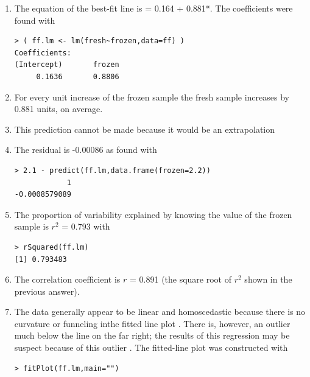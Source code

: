 \documentclass[10pt,openany]{book}\usepackage[]{graphicx}\usepackage[]{color}
\makeatletter
\newenvironment{kframe}{%
 \def\at@end@of@kframe{}%
 \ifinner\ifhmode%
  \def\at@end@of@kframe{\end{minipage}}%
  \begin{minipage}{\columnwidth}%
 \fi\fi%
 \def\FrameCommand##1{\hskip\@totalleftmargin \hskip-\fboxsep
 \colorbox{shadecolor}{##1}\hskip-\fboxsep
     \hskip-\linewidth \hskip-\@totalleftmargin \hskip\columnwidth}%
 \MakeFramed {\advance\hsize-\width
   \@totalleftmargin\z@ \linewidth\hsize
   \@setminipage}}%
 {\par\unskip\endMakeFramed%
 \at@end@of@kframe}
\newenvironment{knitrout}{}{} %
\makeatother
\begin{document}
\begin{itemize}
\begin{enumerate}
      \item The equation of the best-fit line is  = 0.164 + 0.881*.  The coefficients were found with
\begin{knitrout}
\color{fgcolor}\begin{kframe}
\begin{verbatim}
> ( ff.lm <- lm(fresh~frozen,data=ff) )
Coefficients:
(Intercept)       frozen  
     0.1636       0.8806  
\end{verbatim}
\end{kframe}
\end{knitrout}
      \item For every unit increase of the frozen sample the fresh sample increases by 0.881 units, on average.
      \item This prediction cannot be made because it would be an extrapolation
      \item The residual is -0.00086 as found with
\begin{knitrout}
\color{fgcolor}\begin{kframe}
\begin{verbatim}
> 2.1 - predict(ff.lm,data.frame(frozen=2.2))
            1 
-0.0008579089 
\end{verbatim}
\end{kframe}
\end{knitrout}
      \item The proportion of variability explained by knowing the value of the frozen sample is $r^{2}$ = 0.793 with
\begin{knitrout}
\color{fgcolor}\begin{kframe}
\begin{verbatim}
> rSquared(ff.lm)
[1] 0.793483
\end{verbatim}
\end{kframe}
\end{knitrout}
      \item The correlation coefficient is $r$ = 0.891 (the square root of $r^{2}$ shown in the previous answer).
      \item The data generally appear to be linear and homoscedastic because there is no curvature or funneling inthe fitted line plot .  There is, however, an outlier much below the line on the far right; the results of this regression may be suspect because of this outlier .  The fitted-line plot was constructed with
\begin{knitrout}
\color{fgcolor}\begin{kframe}
\begin{verbatim}
> fitPlot(ff.lm,main="")
\end{verbatim}
\end{kframe}\begin{figure}[hbtp]


\end{figure}
\end{knitrout}
\end{enumerate}
\end{itemize}
\end{document}
